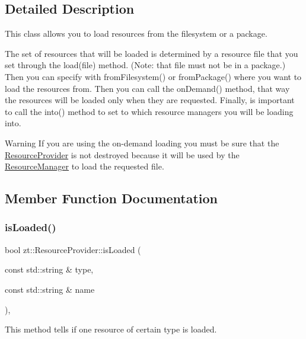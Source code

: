 \subsection{Detailed Description}
This class allows you to load resources from the filesystem or a package. 

The set of resources that will be loaded is determined by a resource file that you set through the load(file) method. (Note\+: that file must not be in a package.) Then you can specify with from\+Filesystem() or from\+Package() where you want to load the resources from. Then you can call the on\+Demand() method, that way the resources will be loaded only when they are requested. Finally, is important to call the into() method to set to which resource managers you will be loading into.

\begin{DoxyWarning}{Warning}
If you are using the on-\/demand loading you must be sure that the \hyperlink{classzt_1_1_resource_provider}{Resource\+Provider} is not destroyed because it will be used by the \hyperlink{classzt_1_1_resource_manager}{Resource\+Manager} to load the requested file. 
\end{DoxyWarning}


\subsection{Member Function Documentation}
\mbox{\label{classzt_1_1_resource_provider_a40819044cb7a63200d99f73a66887be1}} 
\subsubsection{\texorpdfstring{is\+Loaded()}{isLoaded()}}
{\footnotesize\ttfamily bool zt\+::\+Resource\+Provider\+::is\+Loaded (\begin{DoxyParamCaption}\item[{const std\+::string \&}]{type,  }\item[{const std\+::string \&}]{name }\end{DoxyParamCaption})\hspace{0.3cm}{\ttfamily [inline]}, {\ttfamily [protected]}}



This method tells if one resource of certain type is loaded. 


